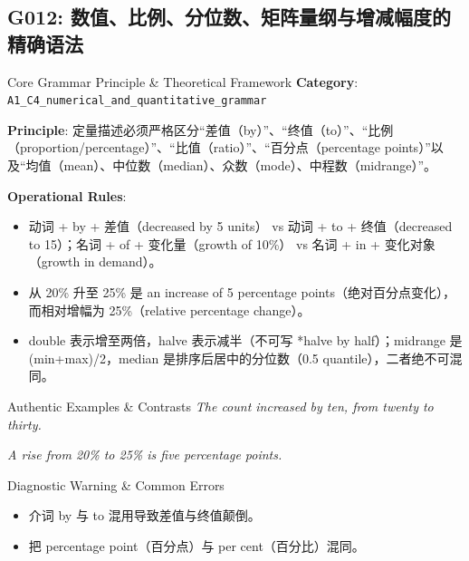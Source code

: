 \subsection{G012: 数值、比例、分位数、矩阵量纲与增减幅度的精确语法}\label{sec:rule:G012}
\begin{ConceptBox}{Core Grammar Principle \& Theoretical Framework}
\textbf{Category}: \texttt{A1\_C4\_numerical\_and\_quantitative\_grammar}\par\vspace{3pt}
\textbf{Principle}: 定量描述必须严格区分“差值（by）”、“终值（to）”、“比例（proportion/percentage）”、“比值（ratio）”、“百分点（percentage points）”以及“均值（mean）、中位数（median）、众数（mode）、中程数（midrange）”。\par\vspace{4pt}
\textbf{Operational Rules}:
\begin{itemize}[leftmargin=1.5em, itemsep=1pt]
  \item 动词 + by + 差值（decreased by 5 units） vs 动词 + to + 终值（decreased to 15）；名词 + of + 变化量（growth of 10\%） vs 名词 + in + 变化对象（growth in demand）。
  \item 从 20\% 升至 25\% 是 an increase of 5 percentage points（绝对百分点变化），而相对增幅为 25\%（relative percentage change）。
  \item double 表示增至两倍，halve 表示减半（不可写 *halve by half）；midrange 是 (min+max)/2，median 是排序后居中的分位数（0.5 quantile），二者绝不可混同。
\end{itemize}
\end{ConceptBox}
\begin{ExampleBox}{Authentic Examples \& Contrasts}
\textit{The count increased by ten, from twenty to thirty.}\par\vspace{2pt}
\textit{A rise from 20\% to 25\% is five percentage points.}\par\vspace{2pt}
\end{ExampleBox}
\begin{TipBox}{Diagnostic Warning \& Common Errors}
\begin{itemize}[leftmargin=1.5em, itemsep=1pt]
  \item 介词 by 与 to 混用导致差值与终值颠倒。
  \item 把 percentage point（百分点）与 per cent（百分比）混同。
\end{itemize}
\end{TipBox}
\vspace{6pt}
